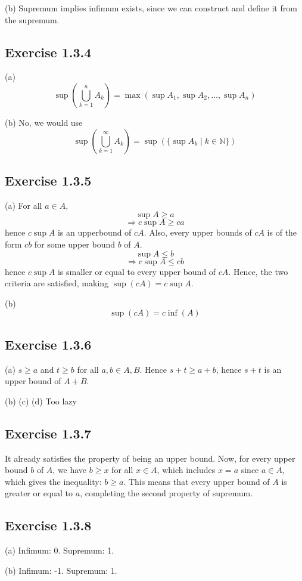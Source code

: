 \documentclass{book}
\begin{document}
\noindent
(b)
Supremum implies infimum exists, since we can construct and define it from the supremum.

\subsection*{Exercise 1.3.4}
(a)
$$\sup \left( \bigcup_{k = 1}^n A_k \right) = \max(\sup A_1, \sup A_2, \ldots, \sup A_n)$$

\noindent
(b)
No, we would use
$$\sup \left( \bigcup_{k = 1}^\infty A_k \right) = \sup(\{ \sup A_k \mid k \in \mathbb{N} \})$$

\subsection*{Exercise 1.3.5}
(a)
For all $a \in A$,
$$\sup A \geq a$$
$$\Rightarrow c \sup A \geq ca$$
hence $c \sup A$ is an upperbound of $cA$. Also, every upper bounds of $cA$ is of the form $cb$ for some upper bound $b$ of $A$.
$$\sup A \leq b$$
$$\Rightarrow c \sup A \leq cb$$
hence $c \sup A$ is smaller or equal to every upper bound of $cA$. Hence, the two criteria are satisfied, making $\sup(cA) = c \sup A$.

\noindent
(b)
$$\sup(cA) = c\inf(A)$$

\subsection*{Exercise 1.3.6}
(a)
$s \geq a$ and $t \geq b$ for all $a, b \in A, B$. Hence $s + t \geq a + b$, hence $s + t$ is an upper bound of $A + B$.

(b) (c) (d) Too lazy

\subsection*{Exercise 1.3.7}
It already satisfies the property of being an upper bound. Now, for every upper bound $b$ of $A$, we have $b \geq x$ for all $x \in A$, which includes $x = a$ since $a \in A$, which gives the inequality: $b \geq a$. This means that every upper bound of $A$ is greater or equal to $a$, completing the second property of supremum.

\subsection*{Exercise 1.3.8}
(a)
Infimum: 0. Supremum: 1.

\noindent
(b)
Infimum: -1. Supremum: 1.
\end{document}
